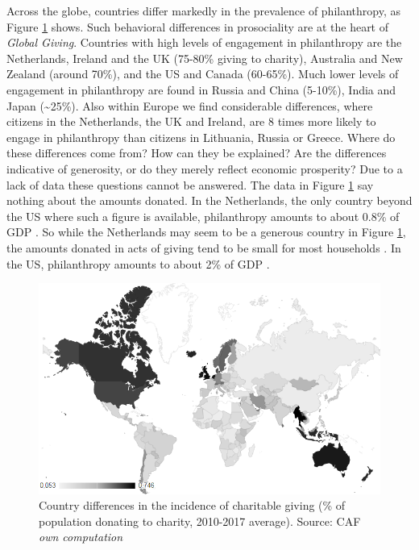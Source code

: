 \documentclass[twocolumn, serif, rga, numeric]{jote-article}
\begin{document}
Across the globe, countries differ markedly in the prevalence of philanthropy, as Figure \ref{fig:map} shows. Such behavioral differences in prosociality are at the heart of \emph{Global Giving}. Countries with high levels of engagement in philanthropy are the Netherlands, Ireland and the UK (75-80\% giving to charity), Australia and New Zealand (around 70\%), and the US and Canada (60-65\%). Much lower levels of engagement in philanthropy are found in Russia and China (5-10\%), India and Japan (\textasciitilde25\%). Also within Europe we find considerable differences, where citizens in the Netherlands, the UK and Ireland, are 8 times more likely to engage in philanthropy than citizens in Lithuania, Russia or Greece. Where do these differences come from? How can they be explained? Are the differences indicative of generosity, or do they merely reflect economic prosperity? Due to a lack of data these questions cannot be answered. The data in Figure \ref{fig:map} say nothing about the amounts donated. In the Netherlands, the only country beyond the US where such a figure is available, philanthropy amounts to about 0.8\% of GDP \cite{Bekkers2015b}. So while the Netherlands may seem to be a generous country in Figure \ref{fig:map}, the amounts donated in acts of giving tend to be small for most households \cite{Bekkers2015b}. In the US, philanthropy amounts to about 2\% of GDP \cite{Foundation2014}.

\begin{figure}[t]
    \centering
    \includegraphics[width=\textwidth]{articles/RGAs/bekkers/map.png}
    \caption{Country differences in the incidence of charitable giving (\% of population donating to charity, 2010-2017 average).
Source: CAF \cite{CharitableGivingFoundation2010}\emph{own computation}}
    \label{fig:map}
\end{figure}
\end{document}
